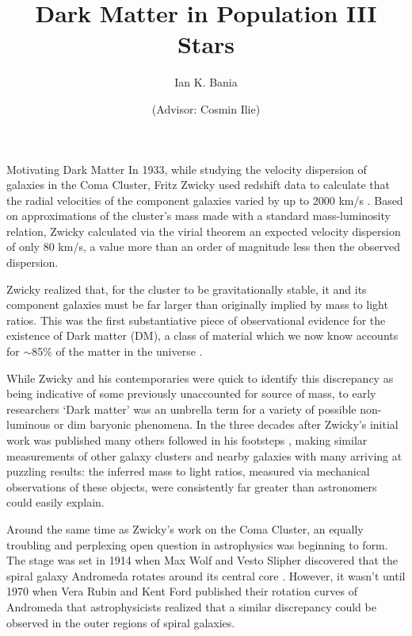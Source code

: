 \documentclass[a4paper,11pt]{article}
\title{\boldmath Dark Matter in Population III Stars}
\author{Ian K. Bania}
\author{(Advisor: Cosmin Ilie)}
\affiliation{Department of Physics and Astronomy, Colgate University\\
13 Oak Dr., Hamilton, NY 13346, U.S.A.}
\begin{document}
\maketitle



\begin{section}{Motivating Dark Matter}
    In 1933, while studying the velocity dispersion of galaxies in the Coma Cluster, Fritz Zwicky used redshift data to calculate that the radial velocities of the component galaxies varied by up to 2000 km/s \cite{Zwicky:1933}.
    Based on approximations of the cluster's mass made with a standard mass-luminosity relation, Zwicky calculated via the virial theorem an expected velocity dispersion of only 80 km/s, a value more than an order of magnitude less then the observed dispersion.

    Zwicky realized that, for the cluster to be gravitationally stable, it and its component galaxies must be far larger than originally implied by mass to light ratios.
    This was the first substantiative piece of observational evidence for the existence of Dark matter (DM), a class of material which we now know accounts for $\sim$85\% of the matter in the universe \cite{Bertone:2018}.

    While Zwicky and his contemporaries were quick to identify this discrepancy as being indicative of some previously unaccounted for source of mass, to early researchers `Dark matter' was an umbrella term for a variety of possible non-luminous or dim baryonic phenomena.
    In the three decades after Zwicky's initial work was published many others followed in his footsteps \cite{Zwicky:1937}\cite{Schwarzschild:1954}\cite{Babcock:1939}\cite{Kahn:1959}, making similar measurements of other galaxy clusters and nearby galaxies with many arriving at puzzling results: the inferred mass to light ratios, measured via mechanical observations of these objects, were consistently far greater than astronomers could easily explain.
     
    Around the same time as Zwicky's work on the Coma Cluster, an equally troubling and perplexing open question in astrophysics was beginning to form.
    The stage was set in 1914 when Max Wolf and Vesto Slipher discovered that the spiral galaxy Andromeda rotates around its central core \cite{Wolf:1914}.
    However, it wasn't until 1970 when Vera Rubin and Kent Ford published their rotation curves of Andromeda \cite{Rubin:1970} that astrophysicists realized that a similar discrepancy could be observed in the outer regions of spiral galaxies.


\end{section}
\end{document}
